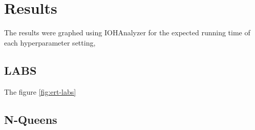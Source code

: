 \documentclass{article}
\begin{document}



\section{Results}\label{sec:results}
The results were graphed using IOHAnalyzer \cite{IOHanalyzer} for the expected running time of each hyperparameter setting, 





\subsection{LABS}
The figure \ref{fig:ert-labs}
\label{fig:ert-labs}

\subsection{N-Queens}
\label{app:f23-runningtime}
\label{fig:ert-nqueens}
\end{document}

